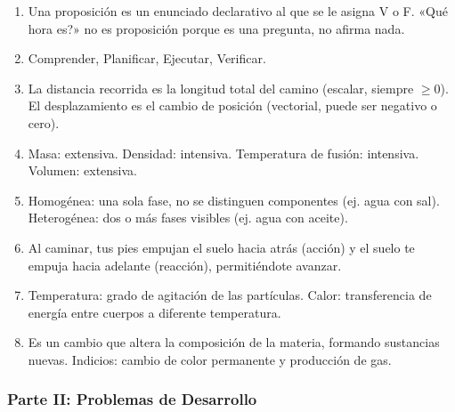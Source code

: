 \documentclass[12pt, letterpaper]{article}
\begin{document}
\begin{enumerate}[leftmargin=*, label=\textbf{\arabic*.}]
  \item Una proposición es un enunciado declarativo al que se le asigna V o F. «\textquestiondown Qué hora es?» no es proposición porque es una pregunta, no afirma nada.

  \item Comprender, Planificar, Ejecutar, Verificar.

  \item La distancia recorrida es la longitud total del camino (escalar, siempre $\geq 0$). El desplazamiento es el cambio de posición (vectorial, puede ser negativo o cero).

  \item Masa: extensiva. Densidad: intensiva. Temperatura de fusión: intensiva. Volumen: extensiva.

  \item Homogénea: una sola fase, no se distinguen componentes (ej. agua con sal). Heterogénea: dos o más fases visibles (ej. agua con aceite).

  \item Al caminar, tus pies empujan el suelo hacia atrás (acción) y el suelo te empuja hacia adelante (reacción), permitiéndote avanzar.

  \item Temperatura: grado de agitación de las partículas. Calor: transferencia de energía entre cuerpos a diferente temperatura.

  \item Es un cambio que altera la composición de la materia, formando sustancias nuevas. Indicios: cambio de color permanente y producción de gas.
\end{enumerate}

\subsubsection*{Parte II: Problemas de Desarrollo}
\end{document}
